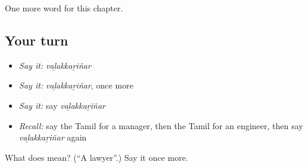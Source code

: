 \begin{grammarlens}[title={What you've built}]
One more word for this chapter.
\end{grammarlens}

\subsection*{Your turn}
\begin{itemize}
\raggedright
  \item \emph{Say it:} \emph{vaḻakkaṟiñar}
  \item \emph{Say it:} \emph{vaḻakkaṟiñar}, once more
  \item \emph{Say it:} say \emph{vaḻakkaṟiñar}
  \item \emph{Recall:} say the Tamil for a manager, then the Tamil for an engineer, then say \emph{vaḻakkaṟiñar} again
\end{itemize}

\begin{tcolorbox}[breakable,colback=teal!4,colframe=teal!35!black,title={Before you move on}]
What does  mean? (\textquotedblleft{}A lawyer\textquotedblright{}.) Say it once more.
\end{tcolorbox}
